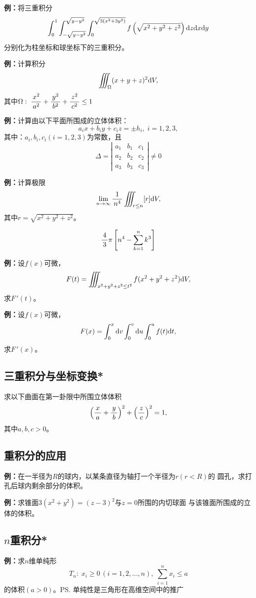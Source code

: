 {\bf 例：}将三重积分
$$\displaystyle\int_0^1\displaystyle\int_{-\sqrt{y-y^2}}^{\sqrt{y-y^2}}
\displaystyle\int_0^{\sqrt{3(x^2+3y^2)}}f\left(
\sqrt{x^2+y^2+z^2}\right)\mathrm{d} z\mathrm{d} x\mathrm{d} y$$
分别化为柱坐标和球坐标下的三重积分。

{\bf 例：}计算积分
$$\iiint_{\Omega}(x+y+z)^2\mathrm{d} V,$$
其中$\Omega:\;\displaystyle\frac{\,{x^2}\,}{\,{a^2}\,}+\displaystyle\frac{\,{y^2}\,}{\,{b^2}\,}+\displaystyle\frac{\,{z^2}\,}{\,{c^2}\,}\leq 1$

{\bf 例：}计算由以下平面所围成的立体体积：
$$a_ix+b_iy+c_iz=\pm h_i,\;i=1,2,3,$$
其中：$a_i,b_i,c_i(i=1,2,3)$为常数，且
$$\Delta=\left|\begin{array}{ccc}
a_1 & b_1 & c_1\\ a_2 & b_2 & c_2 \\ a_3 & b_3 & c_3
\end{array}\right|\ne 0$$

{\bf 例：}计算极限
$$\lim\limits_{n\to\infty}\displaystyle\frac{\,{1}\,}{\,{n^4}\,}\iiint_{r\leq n}[r]\mathrm{d} V,$$
其中$r=\sqrt{x^2+y^2+z^2}$。

$${\displaystyle\frac{\,{4}\,}{\,{3}\,}\pi\left[n^4-\sum\limits_{k=1}^nk^3\right]}$$

{\bf 例：}设$f(x)$可微，
$$F(t)=\iiint_{x^2+y^2+z^2\leq t^2}f(x^2+y^2+z^2)\mathrm{d} V,$$
求$F\,'(t)$。

{\bf 例：}设$f(x)$可微，
$$F(x)=\displaystyle\int_0^x\mathrm{d} v\displaystyle\int_0^v\mathrm{d} u\displaystyle\int_0^uf(t)\mathrm{d} t,$$
求$F\,'(x)$。

\subsection{三重积分与坐标变换*}

求以下曲面在第一卦限中所围立体体积
$$\left(\displaystyle\frac{\,{x}\,}{\,{a}\,}+\displaystyle\frac{\,{y}\,}{\,{b}\,}\right)^2+\left(\displaystyle\frac{\,{z}\,}{\,{c}\,}\right)^2=1,$$
其中$a,b,c>0$。

\subsection{重积分的应用}

{\bf 例：}在一半径为$R$的球内，以某条直径为轴打一个半径为$r(r<R)$的
圆孔，求打孔后球内剩余部分的体积。

{\bf 例：}求锥面$3(x^2+y^2)=(z-3)^2$与$z=0$所围的内切球面
与该锥面所围成的立体的体积。

\subsection{$n$重积分*}

{\bf 例：}求$n$维单纯形
$$T_n:\; x_i\geq 0\,(i=1,2,\ldots,n),\;
\sum\limits_{i=1}^nx_i\leq a$$
的体积$(a>0)$。\ps{单纯性是三角形在高维空间中的推广}

